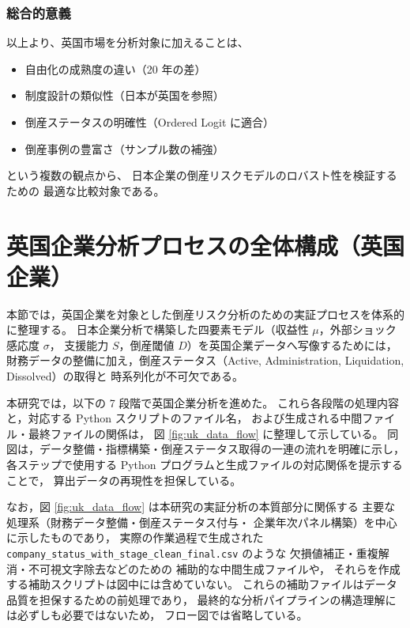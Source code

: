 \subsubsection{総合的意義}

以上より、英国市場を分析対象に加えることは、

\begin{itemize}
    \item 自由化の成熟度の違い（20 年の差）
    \item 制度設計の類似性（日本が英国を参照）
    \item 倒産ステータスの明確性（Ordered Logit に適合）
    \item 倒産事例の豊富さ（サンプル数の補強）
\end{itemize}

という複数の観点から、
日本企業の倒産リスクモデルのロバスト性を検証するための
最適な比較対象である。


\section{英国企業分析プロセスの全体構成（英国企業）}
\label{sec:uk_analysis_full_process}

本節では，英国企業を対象とした倒産リスク分析のための実証プロセスを体系的に整理する。
日本企業分析で構築した四要素モデル（収益性 $\mu$，外部ショック感応度 $\sigma$，
支援能力 $S$，倒産閾値 $D$）を英国企業データへ写像するためには，
財務データの整備に加え，倒産ステータス（Active, Administration, Liquidation, Dissolved）の取得と
時系列化が不可欠である。

本研究では，以下の 7 段階で英国企業分析を進めた。
これら各段階の処理内容と，対応する Python スクリプトのファイル名，
および生成される中間ファイル・最終ファイルの関係は，
図 \ref{fig:uk_data_flow} に整理して示している。
同図は，データ整備・指標構築・倒産ステータス取得の一連の流れを明確に示し，
各ステップで使用する Python プログラムと生成ファイルの対応関係を提示することで，
算出データの再現性を担保している。

なお，図 \ref{fig:uk_data_flow} は本研究の実証分析の本質部分に関係する
主要な処理系（財務データ整備・倒産ステータス付与・
企業年次パネル構築）を中心に示したものであり，
実際の作業過程で生成された
\texttt{company\_status\_with\_stage\_clean\_final.csv} のような
欠損値補正・重複解消・不可視文字除去などのための
補助的な中間生成ファイルや，
それらを作成する補助スクリプトは図中には含めていない。
これらの補助ファイルはデータ品質を担保するための前処理であり，
最終的な分析パイプラインの構造理解には必ずしも必要ではないため，
フロー図では省略している。

